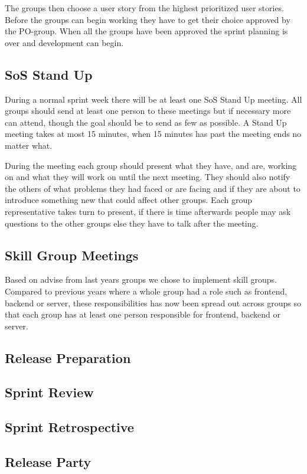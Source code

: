 The groups then choose a user story from the highest prioritized user stories.
Before the groups can begin working they have to get their choice approved by the PO-group.
When all the groups have been approved the sprint planning is over and development can begin.

\subsection{SoS Stand Up}
During a normal sprint week there will be at least one SoS Stand Up meeting.
All groups should send at least one person to these meetings but if necessary more can attend, though the goal should be to send as few as possible.
A Stand Up meeting takes at most 15 minutes, when 15 minutes has past the meeting ends no matter what.

During the meeting each group should present what they have, and are, working on and what they will work on until the next meeting.
They should also notify the others of what problems they had faced or are facing and if they are about to introduce something new that could affect other groups.
Each group representative takes turn to present, if there is time afterwards people may ask questions to the other groups else they have to talk after the meeting.


\subsection{Skill Group Meetings}
Based on advise from last years groups we chose to implement skill groups.
Compared to previous years where a whole group had a role such as frontend, backend or server, these responsibilities has now been spread out across groups so that each group has at least one person responsible for frontend, backend or server.



\subsection{Release Preparation}

\subsection{Sprint Review}

\subsection{Sprint Retrospective}

\subsection{Release Party}


